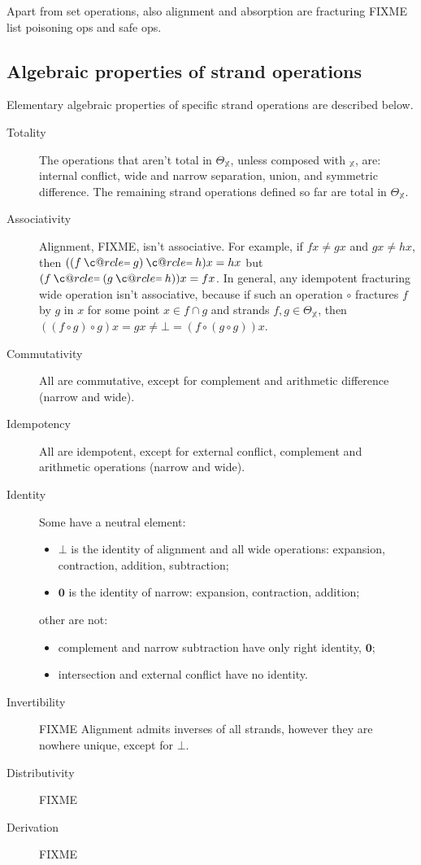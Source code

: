 \documentclass [a4paper,12pt] {article}
\makeatletter
\theoremstyle{definition}
\newcommand{\domain}{}
\DeclareRobustCommand{\domain}{\mathop{\textstyle\mathsmaller{\bf {Dom}}}}
\newcommand{\uni}{}
\DeclareRobustCommand{\uni}{{\textstyle\mathlarger{\mathfrak{u}}}}
\newcommand\c@rcle[2]{\mathbin{\ooalign{\hidewidth$#1#2$\hidewidth\crcr$#1\ocircle$}}}
\newcommand{\oeq}{\mathbin{\mathpalette\c@rcle{\raisebox{0.08em}{$\mathsmaller{=}$}}}}
\makeatother
\begin{document}
Apart from set operations, also alignment and absorption are
fracturing FIXME list poisoning ops and safe ops.

\subsection {Algebraic properties of strand operations}

Elementary algebraic properties of specific strand operations are
described below.
%
\begin {description}
\item[Totality] The operations that aren't total in $\Theta_{\mathbb
  X}$, unless composed with $\uni_{\mathbb X}$, are: internal
  conflict, wide and narrow separation, union, and symmetric
  difference.  The remaining strand operations defined so far are
  total in $\Theta_{\mathbb X}$.
\item[Associativity] Alignment, FIXME, isn't associative.  For
  example, if $fx \neq gx$ and $gx \neq hx$, then $((f \oeq g) \oeq
  h)x = hx$ but $(f \oeq (g \oeq h))x = fx$.  In general, any
  idempotent fracturing wide operation isn't associative, because if
  such an operation $\circ$ fractures $f$ by $g$ in $x$ for some point
  $x \in \domain{f} \cap \domain{g}$ and strands $f, g \in
  \Theta_{\mathbb X}$, then $((f \circ g) \circ g) x = gx \neq \bot =
  (f \circ (g \circ g)) x$.
\item[Commutativity] All are commutative, except for complement and
  arithmetic difference (narrow and wide).
\item[Idempotency] All are idempotent, except for external conflict,
  complement and arithmetic operations (narrow and wide).
\item[Identity] Some have a neutral element:
  \begin {itemize}
  \item $\bm{\bot}$ is the identity of alignment and all wide
    operations: expansion, contraction, addition, subtraction;
  \item $\bm{0}$ is the identity of narrow: expansion, contraction,
    addition;
  \end {itemize}
  other are not:
  \begin {itemize}
  \item complement and narrow subtraction have only right identity,
    $\bm{0}$;
  \item intersection and external conflict have no identity.
  \end {itemize}
\item[Invertibility] FIXME Alignment admits inverses of all strands,
  however they are nowhere unique, except for $\bm{\bot}$.
\item[Distributivity] FIXME
\item[Derivation] FIXME
\end {description}
\end{document}

